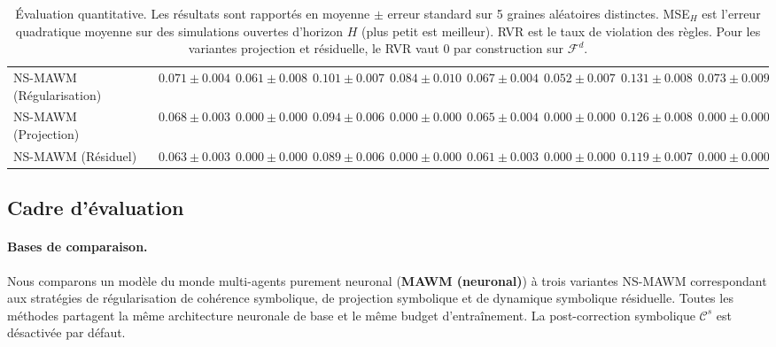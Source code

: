 \documentclass[final]{jfsma}
\theoremstyle{plain}
\theoremstyle{definition}
\theoremstyle{remark}
\begin{document}
\begin{table}[!htb]
{\begin{tabular}{lcccccccc}
      NS-MAWM (Régularisation)                          & $0.071 \pm 0.004$                   & $0.061 \pm 0.008$                   & $0.101 \pm 0.007$                   & $0.084 \pm 0.010$                   & $0.067 \pm 0.004$                   & $0.052 \pm 0.007$                   & $0.131 \pm 0.008$                   & $0.073 \pm 0.009$                   \\
      NS-MAWM (Projection)                              & $0.068 \pm 0.003$                   & $\mathbf{0.000} \pm \mathbf{0.000}$ & $0.094 \pm 0.006$                   & $\mathbf{0.000} \pm \mathbf{0.000}$ & $0.065 \pm 0.004$                   & $\mathbf{0.000} \pm \mathbf{0.000}$ & $0.126 \pm 0.008$                   & $\mathbf{0.000} \pm \mathbf{0.000}$ \\
      NS-MAWM (Résiduel)                                & $\mathbf{0.063} \pm \mathbf{0.003}$ & $\mathbf{0.000} \pm \mathbf{0.000}$ & $\mathbf{0.089} \pm \mathbf{0.006}$ & $\mathbf{0.000} \pm \mathbf{0.000}$ & $\mathbf{0.061} \pm \mathbf{0.003}$ & $\mathbf{0.000} \pm \mathbf{0.000}$ & $\mathbf{0.119} \pm \mathbf{0.007}$ & $\mathbf{0.000} \pm \mathbf{0.000}$ \\
      \bottomrule
    \end{tabular}
  }
  \caption{Évaluation quantitative. Les résultats sont rapportés en moyenne $\pm$ erreur standard sur 5 graines aléatoires distinctes. MSE$_H$ est l'erreur quadratique moyenne sur des simulations ouvertes d'horizon $H$ (plus petit est meilleur). RVR est le taux de violation des règles. Pour les variantes projection et résiduelle, le RVR vaut $0$ par construction sur $\mathcal{F}^d$.}
  \label{tab:results_overview}
\end{table}

\subsection{Cadre d'évaluation}
\label{sec:metrics_baselines_protocol}

\paragraph{Bases de comparaison.}
Nous comparons un modèle du monde multi-agents purement neuronal
(\textbf{MAWM (neuronal)}) à trois variantes NS-MAWM correspondant aux stratégies de régularisation de cohérence symbolique, de projection symbolique et de dynamique symbolique résiduelle.
Toutes les méthodes partagent la même architecture neuronale de base et le même budget d'entraînement. La post-correction symbolique $\mathcal{C}^s$ est désactivée par défaut.
\end{document}

